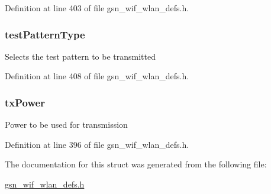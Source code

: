 Definition at line 403 of file gsn\_\-wif\_\-wlan\_\-defs.h.

\hypertarget{a00189_aed5aa730c4619f7bc2b04f439f4701a9}{
\subsubsection[{testPatternType}]{ {\bf testPatternType}}}
\label{a00189_aed5aa730c4619f7bc2b04f439f4701a9}
Selects the test pattern to be transmitted 

Definition at line 408 of file gsn\_\-wif\_\-wlan\_\-defs.h.

\hypertarget{a00189_a763a8a049f451428e05835d3c3b466cd}{
\subsubsection[{txPower}]{ {\bf txPower}}}
\label{a00189_a763a8a049f451428e05835d3c3b466cd}
Power to be used for transmission 

Definition at line 396 of file gsn\_\-wif\_\-wlan\_\-defs.h.



The documentation for this struct was generated from the following file:\begin{DoxyCompactItemize}
\item 
\hyperlink{a00613}{gsn\_\-wif\_\-wlan\_\-defs.h}\end{DoxyCompactItemize}
